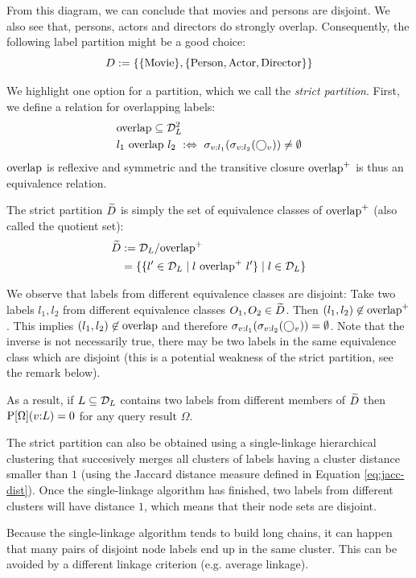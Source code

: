 From this diagram, we can conclude that movies and persons are disjoint.
We also see that, persons, actors and directors do strongly overlap.
Consequently, the following label partition might be a good choice:
\[
  D := \{ \{ \text{Movie} \},
               \{ \text{Person}, \text{Actor}, \text{Director} \} \}
\]

We highlight one option for a partition, which we call the
\emph{strict partition}. First, we define a relation for overlapping labels:
\begin{align}
\begin{split}
  &\text{overlap} \subseteq \mathcal{D}_L^2 \\
  &l_1 ~\text{overlap}~ l_2 ~:\Leftrightarrow~
    \sigma_{v:l_1}(\sigma_{v:l_2}(\bigcirc_{v})) \not = \emptyset
\end{split}
\end{align}
$\text{overlap}$ is reflexive and symmetric and the transitive closure
$\text{overlap}^+$ is thus an equivalence relation.

The strict partition $\widetilde{D}$ is simply the set of equivalence classes
of $\text{overlap}^+$ (also called the quotient set):
\begin{align}
\begin{split}
  \widetilde{D} &:= \mathcal{D}_L / \text{overlap}^+ \\
               &= \{ \{ l' \in \mathcal{D}_L \mid l ~\text{overlap}^+~ l' \}
                      \mid l \in \mathcal{D}_L \}
\end{split}
\end{align}

We observe that labels from different equivalence classes are disjoint:
Take two labels $l_1, l_2$ from different equivalence classes
$O_1, O_2 \in \widetilde{D}$. Then $(l_1, l_2) \not \in \text{overlap}^+$.
This implies $(l_1, l_2) \not \in \text{overlap}$ and therefore
$\sigma_{v:l_1}(\sigma_{v:l_2}(\bigcirc_{v})) = \emptyset$.
Note that the inverse is not necessarily true, there may be two labels in the
same equivalence class which are disjoint (this is a potential weakness of the
strict partition, see the remark below).

As a result, if $L \subseteq \mathcal{D}_L$ contains two labels from different
members of $\widetilde{D}$ then $\operatorname{P}[\Omega](v{:}L) = 0$ for any query result
$\Omega$.

\begin{remark}
The strict partition can also be obtained using a single-linkage
hierarchical clustering that succesively merges all clusters of labels
having a cluster distance smaller than $1$ (using the Jaccard distance
measure defined in Equation \ref{eq:jacc-dist}).
Once the single-linkage algorithm has finished, two
labels from different clusters will have distance $1$, which means that their
node sets are disjoint.

Because the single-linkage algorithm tends to build long chains, it can happen
that many pairs of disjoint node labels end up in the same cluster.
This can be avoided by a different linkage criterion (e.g. average linkage).
\end{remark}

